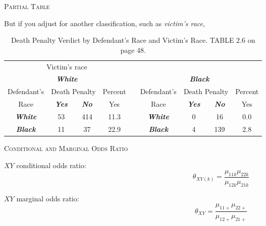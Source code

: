\documentclass[dvipdfmx, serif,handout]{beamer}
\begin{document}
\begin{frame}{\textsc{Partial Table}}

	\bi
	\item But if you adjust for another classification, such as {\em victim's race},
	\vspace{.5cm}
	{\scriptsize
		\begin{table}
			{\tabcolsep=0.03in
				\begin{tabular}{ccccccccc} \hline
					\multicolumn{4}{c}{{Victim's race}}                                                                                                                                                        \\
					\multicolumn{4}{c}{\bf{\em White}} &                                   & \multicolumn{4}{c}{\bf{\em Black}}                                                                                \\ \cline{1-4} \cline{6-9}
					Defendant's                        & \multicolumn{2}{c}{Death Penalty} & Percent                            &      & Defendant's &
					\multicolumn{2}{c}{Death Penalty}  & Percent                                                                                                                                               \\ \cline{2-3} \cline{7-8}
					{Race}                             & {\bf{\em Yes}}                    & {\bf{\em No}}                      & Yes  &             & {Race}           & {\bf{\em Yes}} & {\bf{\em No}} & Yes \\ \cline{1-4} \cline{6-9}
					{\bf{\em White}}                   & 53                                & 414                                & 11.3 &             & {\bf{\em White}} & 0              & 16            & 0.0 \\
					{\bf{\em Black}}                   & 11                                & 37                                 & 22.9 &             & {\bf{\em Black}} & 4              & 139           & 2.8 \\ \hline
				\end{tabular}
				\caption{\scriptsize Death Penalty Verdict by Defendant's Race and Victim's Race. TABLE 2.6 on page 48.}
			}
		\end{table}
	}
	\ei

\end{frame}
\begin{frame}{\textsc{Conditional and Marginal Odds Ratio}}

	\bi
	\item $XY$ conditional odds ratio:
	$$\theta_{XY(k)} = \frac{\mu_{11k}\mu_{22k}}{\mu_{12k}\mu_{21k}}$$
	\item $XY$ marginal odds ratio:
	$$\theta_{XY} = \frac{\mu_{11+}\mu_{22+}}{\mu_{12+}\mu_{21+}}$$
	\ei

\end{frame}
\end{document}
